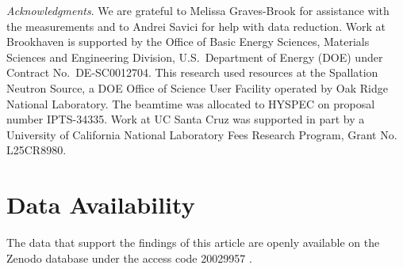\documentclass[aps, prl, twocolumn, superscriptaddress, longbibliography]{revtex4-2}
\begin{document}
{\it Acknowledgments}.
We are grateful to Melissa Graves-Brook for assistance with the measurements and to Andrei Savici for help with data reduction.
Work at Brookhaven is supported by the Office of Basic Energy Sciences, Materials Sciences and Engineering Division, U.S.\ Department of Energy (DOE) under Contract No.\ DE-SC0012704. This research used resources at the Spallation Neutron Source, a DOE Office of Science User Facility operated by Oak Ridge National Laboratory. The beamtime was allocated to HYSPEC on proposal number IPTS-34335. Work at UC Santa Cruz was supported in part by a University of California National Laboratory Fees Research Program, Grant No. L25CR8980.

\section*{Data Availability}
The data that support the findings of this article are openly available on the Zenodo database under the access code 20029957 \cite{repo}.
\end{document}
